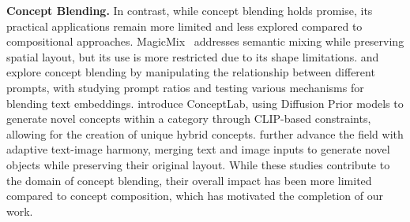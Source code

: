 \textbf{Concept Blending. }In contrast, while concept blending holds promise, its practical applications remain more limited and less explored compared to compositional approaches. MagicMix~\citep{liew2022magicmix} addresses semantic mixing while preserving spatial layout, but its use is more restricted due to its shape limitations. \citet{melzi2023does} and \citet{olearo2024blend} explore concept blending by manipulating the relationship between different prompts, with \citet{melzi2023does} studying prompt ratios and \citet{olearo2024blend} testing various mechanisms for blending text embeddings. \citet{richardson2024conceptlab} introduce ConceptLab, using Diffusion Prior models to generate novel concepts within a category through CLIP-based constraints, allowing for the creation of unique hybrid concepts. \citet{xiong2024novel} further advance the field with adaptive text-image harmony, merging text and image inputs to generate novel objects while preserving their original layout. While these studies contribute to the domain of concept blending, their overall impact has been more limited compared to concept composition, which has motivated the completion of our work.